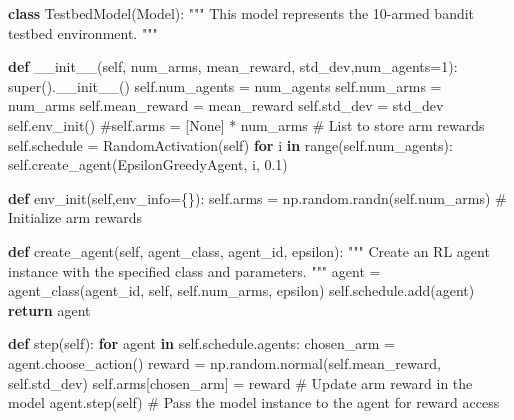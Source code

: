 \documentclass[
  letterpaper,
  DIV=11,
  numbers=noendperiod,
  oneside]{scrartcl}
\newenvironment{Shaded}{\begin{snugshade}}{\end{snugshade}}
\newcommand{\BuiltInTok}[1]{\textcolor[rgb]{0.00,0.23,0.31}{#1}}
\newcommand{\CommentTok}[1]{\textcolor[rgb]{0.37,0.37,0.37}{#1}}
\newcommand{\ControlFlowTok}[1]{\textcolor[rgb]{0.00,0.23,0.31}{\textbf{#1}}}
\newcommand{\DecValTok}[1]{\textcolor[rgb]{0.68,0.00,0.00}{#1}}
\newcommand{\FloatTok}[1]{\textcolor[rgb]{0.68,0.00,0.00}{#1}}
\newcommand{\FunctionTok}[1]{\textcolor[rgb]{0.28,0.35,0.67}{#1}}
\newcommand{\KeywordTok}[1]{\textcolor[rgb]{0.00,0.23,0.31}{\textbf{#1}}}
\newcommand{\NormalTok}[1]{\textcolor[rgb]{0.00,0.23,0.31}{#1}}
\newcommand{\OperatorTok}[1]{\textcolor[rgb]{0.37,0.37,0.37}{#1}}
\newcommand{\VariableTok}[1]{\textcolor[rgb]{0.07,0.07,0.07}{#1}}
\theoremstyle{definition}
\theoremstyle{remark}
\begin{document}
\begin{Shaded}
\begin{Highlighting}[]
\KeywordTok{class}\NormalTok{ TestbedModel(Model):}
    \CommentTok{"""}
\CommentTok{    This model represents the 10{-}armed bandit testbed environment.}
\CommentTok{    """}

    \KeywordTok{def} \FunctionTok{\_\_init\_\_}\NormalTok{(}\VariableTok{self}\NormalTok{, num\_arms, mean\_reward, std\_dev,num\_agents}\OperatorTok{=}\DecValTok{1}\NormalTok{):}
        \BuiltInTok{super}\NormalTok{().}\FunctionTok{\_\_init\_\_}\NormalTok{()}
        \VariableTok{self}\NormalTok{.num\_agents }\OperatorTok{=}\NormalTok{ num\_agents}
        \VariableTok{self}\NormalTok{.num\_arms }\OperatorTok{=}\NormalTok{ num\_arms}
        \VariableTok{self}\NormalTok{.mean\_reward }\OperatorTok{=}\NormalTok{ mean\_reward}
        \VariableTok{self}\NormalTok{.std\_dev }\OperatorTok{=}\NormalTok{ std\_dev}
        \VariableTok{self}\NormalTok{.env\_init()}
        \CommentTok{\#self.arms = [None] * num\_arms  \# List to store arm rewards}
        \VariableTok{self}\NormalTok{.schedule }\OperatorTok{=}\NormalTok{ RandomActivation(}\VariableTok{self}\NormalTok{)}
        \ControlFlowTok{for}\NormalTok{ i }\KeywordTok{in} \BuiltInTok{range}\NormalTok{(}\VariableTok{self}\NormalTok{.num\_agents):}
          \VariableTok{self}\NormalTok{.create\_agent(EpsilonGreedyAgent, i, }\FloatTok{0.1}\NormalTok{) }

    \KeywordTok{def}\NormalTok{ env\_init(}\VariableTok{self}\NormalTok{,env\_info}\OperatorTok{=}\NormalTok{\{\}):}
        \VariableTok{self}\NormalTok{.arms }\OperatorTok{=}\NormalTok{ np.random.randn(}\VariableTok{self}\NormalTok{.num\_arms)  }\CommentTok{\# Initialize arm rewards}

    \KeywordTok{def}\NormalTok{ create\_agent(}\VariableTok{self}\NormalTok{, agent\_class, agent\_id, epsilon):}
        \CommentTok{"""}
\CommentTok{        Create an RL agent instance with the specified class and parameters.}
\CommentTok{        """}
\NormalTok{        agent }\OperatorTok{=}\NormalTok{ agent\_class(agent\_id, }\VariableTok{self}\NormalTok{, }\VariableTok{self}\NormalTok{.num\_arms, epsilon)}
        \VariableTok{self}\NormalTok{.schedule.add(agent)}
        \ControlFlowTok{return}\NormalTok{ agent}

    \KeywordTok{def}\NormalTok{ step(}\VariableTok{self}\NormalTok{):}
        \ControlFlowTok{for}\NormalTok{ agent }\KeywordTok{in} \VariableTok{self}\NormalTok{.schedule.agents:}
\NormalTok{            chosen\_arm }\OperatorTok{=}\NormalTok{ agent.choose\_action()}
\NormalTok{            reward }\OperatorTok{=}\NormalTok{ np.random.normal(}\VariableTok{self}\NormalTok{.mean\_reward, }\VariableTok{self}\NormalTok{.std\_dev)}
            \VariableTok{self}\NormalTok{.arms[chosen\_arm] }\OperatorTok{=}\NormalTok{ reward  }\CommentTok{\# Update arm reward in the model}
\NormalTok{            agent.step(}\VariableTok{self}\NormalTok{)  }\CommentTok{\# Pass the model instance to the agent for reward access}


\end{Highlighting}
\end{Shaded}
\end{document}

